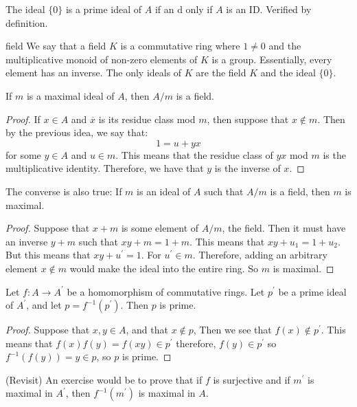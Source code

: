 \documentclass{report}
\begin{document}
The ideal $\{0\}$ is a prime ideal of $A$ if an d only if $A$ is an ID. Verified by definition.

\begin{definition}{field}
    We say that a field $K$ is a commutative ring where $1 \neq 0$ and the multiplicative monoid of non-zero elements of $K$ is a group. Essentially, every element has an inverse. The only ideals of $K$ are the field $K$ and the ideal $\{0\}$.
\end{definition}

If $m$ is a maximal ideal of $A$, then $A/m$ is a field.
    \begin{proof}
        If $x \in A$ and $\overline{x}$ is its residue class mod $m$, then suppose that $x \notin m$. Then by the previous idea, we say that:
            \begin{equation*}
                1 = u + yx
            \end{equation*}
        for some $y \in A$ and $u \in m$. This means that the residue class of $yx$ mod $m$ is the multiplicative identity. Therefore, we have that $y$ is the inverse of $x$.
    \end{proof}

The converse is also true: If $m$ is an ideal of $A$ such that $A/m$ is a field, then $m$ is maximal.
    \begin{proof}
        Suppose that $x + m$ is some element of $A/m$, the field. Then it must have an inverse $y + m$ such that $xy + m = 1 + m$. This means that $xy + u_{1} = 1 + u_{2}$. But this means that $xy + u^{\prime} = 1$. For $u^{\prime} \in m$. Therefore, adding an arbitrary element $x \notin m$ would make the ideal into the entire ring. So $m$ is maximal.
    \end{proof}

Let $f : A \rightarrow A^{\prime}$ be a homomorphism of commutative rings. Let $p^{\prime}$ be a prime ideal of $A^{\prime}$, and let $p = f^{-1}(p^{\prime})$. Then $p$ is prime.
    \begin{proof}
        Suppose that $x, y \in A$, and that $x \notin p$, Then we see that $f(x) \notin p^{\prime}$. This means that $f(x)f(y) = f(xy) \in p^{\prime}$ therefore, $f(y) \in p^{\prime}$ so $f^{-1}(f(y)) = y \in p$, so $p$ is prime.
    \end{proof}

(Revisit) An exercise would be to prove that if $f$ is surjective and if $m^{\prime}$ is maximal in $A^{\prime}$, then $f^{-1}(m^{\prime})$ is maximal in $A$.
\end{document}
